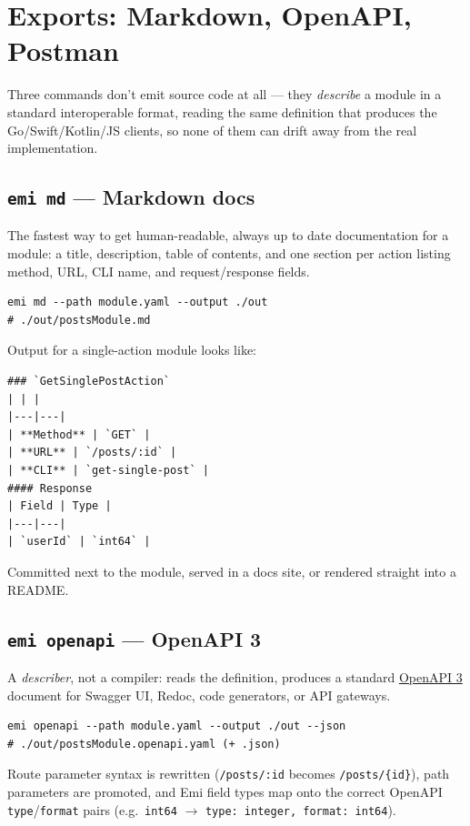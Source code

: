 \section{Exports: Markdown, OpenAPI, Postman}
\label{sec:exports}

Three commands don't emit source code at all --- they \emph{describe} a
module in a standard interoperable format, reading the same definition
that produces the Go/Swift/Kotlin/JS clients, so none of them can drift
away from the real implementation.

\subsection{\texttt{emi md} --- Markdown docs}
The fastest way to get human-readable, always up to date documentation
for a module: a title, description, table of contents, and one section
per action listing method, URL, CLI name, and request/response fields.
\begin{lstlisting}
emi md --path module.yaml --output ./out
# ./out/postsModule.md
\end{lstlisting}
Output for a single-action module looks like:
\begin{lstlisting}
### `GetSinglePostAction`
| | |
|---|---|
| **Method** | `GET` |
| **URL** | `/posts/:id` |
| **CLI** | `get-single-post` |
#### Response
| Field | Type |
|---|---|
| `userId` | `int64` |
\end{lstlisting}
Committed next to the module, served in a docs site, or rendered straight
into a README.

\subsection{\texttt{emi openapi} --- OpenAPI 3}
A \emph{describer}, not a compiler: reads the definition, produces a
standard \href{https://spec.openapis.org/oas/v3.0.3}{OpenAPI 3} document
for Swagger UI, Redoc, code generators, or API gateways.
\begin{lstlisting}
emi openapi --path module.yaml --output ./out --json
# ./out/postsModule.openapi.yaml (+ .json)
\end{lstlisting}
Route parameter syntax is rewritten (\texttt{/posts/:id} becomes
\texttt{/posts/\{id\}}), path parameters are promoted, and Emi field
types map onto the correct OpenAPI \texttt{type}/\texttt{format} pairs
(e.g.\ \texttt{int64} $\to$ \texttt{type: integer, format: int64}).

